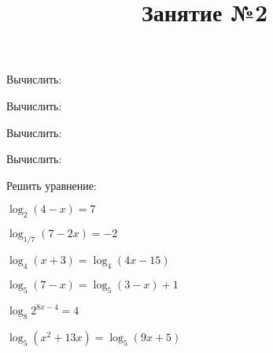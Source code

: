 \newpage
\title{Занятие №2}
\begin{listofex}
	\item Вычислить:
\begin{enumcols}[itemcolumns=3]
	\item {}
	\item {}
	\item {}
	\item {}
	\item {}
\end{enumcols}
\item Вычислить:
\begin{enumcols}[itemcolumns=3]
	\item {}
	\item {}
	\item {}
\end{enumcols}
\item Вычислить:
\begin{enumcols}[itemcolumns=3]
	\item {}
	\item {}
	\item {}
	\item {}
	\item {}
	\item {}
	\item {}
\end{enumcols}
\item Вычислить:
\begin{enumcols}[itemcolumns=2]
	\item {}
	\item {}
	\item {}
	\item {}
\end{enumcols}
\item Решить уравнение:
\begin{enumcols}[itemcolumns=2]
	\item \( \log_2(4-x)=7 \)
	\item \( \log_{1/7}(7-2x)=-2 \)
	\item \( \log_4(x+3)=\log_4(4x-15) \)
	\item \( \log_5(7-x)=\log_5(3-x)+1 \)
	\item \( \log_8 2^{8x-4}=4 \)
	\item \( \log_5(x^2+13x)=\log_5(9x+5) \)
\end{enumcols}
\end{listofex}
